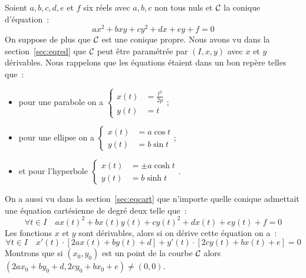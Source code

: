 Soient \(a, b, c, d, e\) et \(f\) six réels avec \(a, b, c\) non tous nuls et
\(\mathcal{C}_{{}}\) la conique d'équation~:
\begin{equation}
  ax^2 + bxy + cy^2 + dx + ey + f = 0
\end{equation}
On suppose de plus que \(\mathcal{C}_{{}}\) est une conique propre. Nous avons vu dans
la section~\ref{sec:eqred} que \(\mathcal{C}_{{}}\) peut être paramétrée par
\((I, x, y)\) avec \(x\) et \(y\) dérivables. Nous rappelons que les équations
étaient dans un bon repère telles que~:
\begin{itemize}
  \item pour une parabole on a \(\begin{cases} x(t) &= \frac{t^2}{2p} \\ y(t)
    &= t \end{cases}\);
  \item pour une ellipse on a \(\begin{cases} x(t) &= a\cos t\\ y(t) &=
      b\sin t \end{cases}\);
  \item  et pour l'hyperbole \(\begin{cases} x(t) &= \pm a\cosh t\\ y(t)
        &= b\sinh t \end{cases}\).
\end{itemize}
On a aussi vu dans la section~\ref{sec:eqcart} que n'importe quelle
conique admettait une équation cartésienne de degré deux telle que~:
\begin{equation}
  \forall t \in I \quad   ax(t)^2 + bx(t)y(t) + cy(t)^2 + dx(t) + ey(t) + f = 0
\end{equation}
Les fonctions \(x\) et \(y\) sont dérivables, alors si on dérive cette
équation on a~:
\begin{equation}
  \forall t \in I \quad x'(t) \cdot [2ax(t) + by(t) + d] + y'(t) \cdot
  [2cy(t) + bx(t) + e] = 0
\end{equation}
Montrons que si \((x_0, y_0)\) est un point de la courbe \(\mathcal{C}_{{}}\)
alors \((2ax_0 + by_0 + d, 2cy_0 + bx_0 + e)\neq (0, 0)\).

